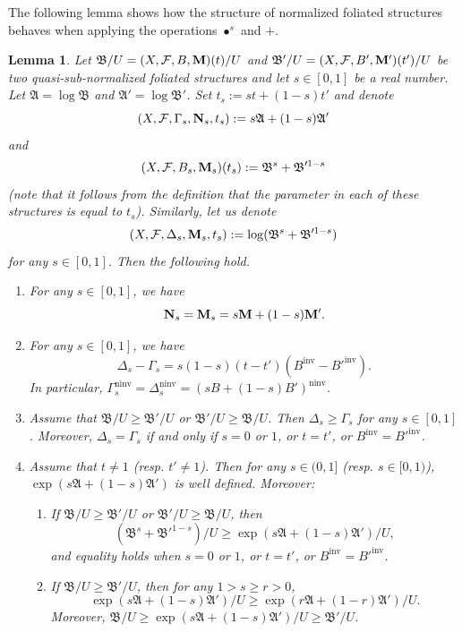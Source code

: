 \documentclass[11pt,reqno]{amsart}
\numberwithin{equation}{section}
\newcommand{\Mm}{{\bf{M}}}
\newcommand{\Nn}{{\bf{N}}}
\newcommand{\ninv}{\operatorname{ninv}}
\newcommand{\inv}{\operatorname{inv}}
\newcommand{\Aa}{{\mathfrak{A}}}
\newcommand{\Bb}{{\mathfrak{B}}}
\newcommand{\Ff}{\mathcal{F}}
\newtheorem{lem}[thm]{Lemma}
\theoremstyle{definition}
\begin{document}
The following lemma shows how the structure of normalized foliated structures behaves when applying the operations $\bullet^s$ and $+$.

\begin{lem}\label{lem: geometric average of nfs}
Let $\Bb/U=(X,\Ff,B,\Mm)(t)/U$ and $\Bb'/U=(X,\Ff,B',\Mm')(t')/U$ be two quasi-sub-normalized foliated structures and let $s\in [0,1]$ be a real number. Let $\Aa=\log\Bb$ and $\Aa'=\log\Bb'$. Set $t_s := st+(1-s)t'$ and denote
\[(X,\Ff,\Gamma_s,\Nn_s,t_s):= s\Aa+(1-s)\Aa'\] and \[(X,\Ff,B_s,\Mm_s)(t_s):=\Bb^s+\Bb'^{1-s}\]
(note that it follows from the definition that the parameter in each of these structures is equal to $t_s$).
Similarly, let us denote \[(X,\Ff,\Delta_s,\Mm_s,t_s):=\log(\Bb^s+\Bb'^{1-s})\]
for any $s\in [0,1]$. Then the following hold. 
\begin{enumerate}
    \item For any $s\in [0,1]$, we have 
\[\Nn_s=\Mm_s=s\Mm+(1-s)\Mm'.\]
\item For any $s\in [0,1]$, we have 
\[\Delta_s-\Gamma_s=s(1-s)(t-t')(B^{\inv}-B'^{\inv}).\]
In particular,
$\Gamma_s^{\ninv}=\Delta_s^{\ninv}=(sB+(1-s)B')^{\ninv}$.
\item Assume that $\Bb/U\geq\Bb'/U$ or $\Bb'/U\geq\Bb/U$. Then $\Delta_s\geq\Gamma_s$ for any $s\in [0,1]$. Moreover, $\Delta_s=\Gamma_s$ if and only if $s=0$ or $1$, or $t=t'$, or $B^{\inv}=B'^{\inv}$.
\item Assume that $t\neq1$ (resp. $t'\neq1$). Then for any $s\in (0,1]$ (resp. $s \in [0,1)$),  $\exp(s\Aa+(1-s)\Aa')$ is well defined. Moreover:
\begin{enumerate}
    \item If $\Bb/U\geq\Bb'/U$ or $\Bb'/U\geq\Bb/U$, then 
\[(\Bb^s+\Bb'^{1-s})/U\geq\exp(s\Aa+(1-s)\Aa')/U,\]
and equality holds when $s=0$ or $1$, or $t=t'$, or $B^{\inv}=B'^{\inv}$. 
\item If $\Bb/U\geq\Bb'/U$, then for any $1>s\geq r>0$, 
\[\exp\left(s\Aa+(1-s)\Aa'\right)/U\geq\exp\left(r\Aa+(1-r)\Aa'\right)/U.\]
Moreover, $\Bb/U\geq \exp(s\Aa+(1-s)\Aa')/U\geq\Bb'/U$.
\end{enumerate}
\end{enumerate}
\end{lem}
\end{document}
